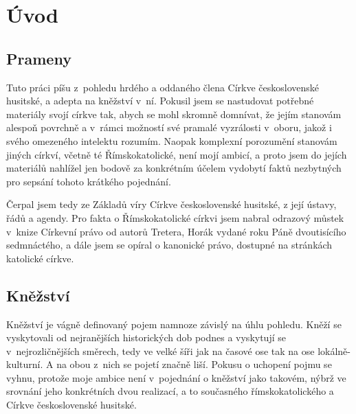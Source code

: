 \chapter{Úvod}
\label{kap:uvod}

\section{Prameny}

Tuto práci píšu z~pohledu hrdého a oddaného člena Církve československé
husitské, a adepta na kněžství v~ní. Pokusil jsem se nastudovat potřebné
materiály svojí církve tak, abych se mohl skromně domnívat, že jejím stanovám
alespoň povrchně a v~rámci možností své pramalé vyzrálosti v~oboru, jakož i
svého omezeného intelektu rozumím. Naopak komplexní porozumění stanovám jiných
církví, včetně té Římskokatolické, není mojí ambicí, a proto jsem do jejích
materiálů nahlížel jen bodově za konkrétním účelem vydobytí faktů nezbytných pro
sepsání tohoto krátkého pojednání.

Čerpal jsem tedy ze Základů víry Církve československé husitské, z její ústavy,
řádů a agendy. Pro fakta o Římskokatolické církvi jsem nabral odrazový můstek
v~knize Církevní právo od autorů Tretera, Horák vydané roku Páně dvoutisícího
sedmnáctého, a dále jsem se opíral o kanonické právo, dostupné na stránkách
katolické církve.

\section{Kněžství}

Kněžství je vágně definovaný pojem namnoze závislý na úhlu pohledu. Kněží se
vyskytovali od nejranějších historických dob podnes a vyskytují se
v~nejrozličnějších směrech, tedy ve velké šíři jak na časové ose tak na ose
lokálně-kulturní. A na obou z~nich se pojetí značně liší. Pokusu o uchopení
pojmu se vyhnu, protože moje ambice není v~pojednání o kněžství jako takovém,
nýbrž ve srovnání jeho konkrétních dvou realizací, a to současného
římskokatolického a Církve československé husitské.

